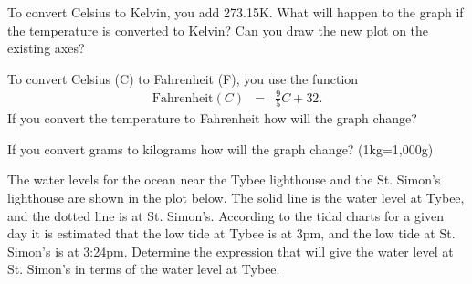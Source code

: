 \begin{problem}
\begin{subproblem}
    \item To convert Celsius to Kelvin, you add 273.15K. What will
      happen to the graph if the temperature is converted to Kelvin?
      Can you draw the new plot on the existing axes?
    
      \vfill
      
    \item To convert Celsius (C) to Fahrenheit (F), you use the
      function
      \begin{eqnarray*}
        \mathrm{Fahrenheit}(C) & = & \frac{9}{5}C + 32.
      \end{eqnarray*}
      If you convert the temperature to Fahrenheit how will the graph
      change?
    
      \vfill
    
    \item If you convert grams to kilograms how will the graph change?
      (1kg=1,000g)

  \end{subproblem}

\clearpage

\item The water levels for the ocean near the Tybee lighthouse and the
  St. Simon's lighthouse are shown in the plot below. The solid line
  is the water level at Tybee, and the dotted line is at
  St. Simon's. According to the tidal charts for a given day it is
  estimated that the low tide at Tybee is at 3pm, and the low tide at
  St. Simon's is at 3:24pm. Determine the expression that will give
  the water level at St. Simon's in terms of the water level at Tybee.

\hspace{-4em}
\end{problem}
